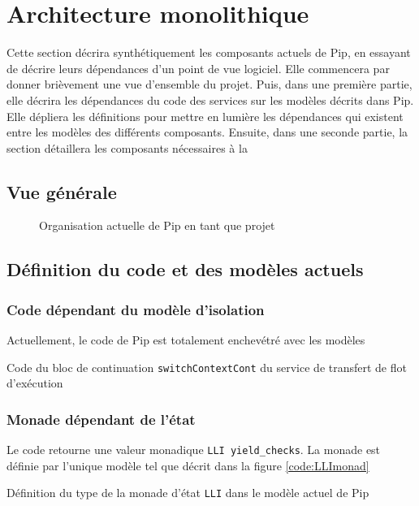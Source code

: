 	\section{Architecture monolithique}

		Cette section décrira synthétiquement les composants actuels de Pip, en essayant de décrire leurs dépendances d'un point de vue logiciel. Elle commencera par donner brièvement une vue d'ensemble du projet. Puis, dans une première partie, elle décrira les dépendances du code des services sur les modèles décrits dans Pip. Elle dépliera les définitions pour mettre en lumière les dépendances qui existent entre les modèles des différents composants. Ensuite, dans une seconde partie, la section détaillera les composants nécessaires à la 
		
		\subsection{Vue générale}

			\begin{figure}[!ht]
				
				\caption{Organisation actuelle de Pip en tant que projet}
				\label{fig:switchContextCont}
			\end{figure}

		\subsection{Définition du code et des modèles actuels}


			\subsubsection{Code dépendant du modèle d'isolation}

			Actuellement, le code de Pip est totalement enchevétré avec les modèles

			\begin{listing}[!ht]
				\caption{Code du bloc de continuation \texttt{switchContextCont} du service de transfert de flot d'exécution}
				\label{code:switchContextCont}
			\end{listing}

			\subsubsection{Monade dépendant de l'état}

		Le code retourne une valeur monadique \texttt{LLI yield\_checks}. La monade est définie par l'unique modèle tel que décrit dans la figure \ref{code:LLImonad}
		\begin{listing}[!ht]
			\caption{Définition du type de la monade d'état \texttt{LLI} dans le modèle actuel de Pip}
			\label{code:LLImonad}
		\end{listing}

